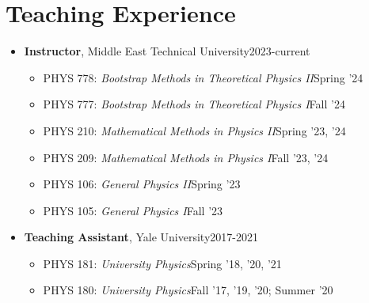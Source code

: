 \documentclass[a4paper,11pt]{article}
\begin{document}
 \section{\textcolor{burntorange}{Teaching Experience}}
\begin{itemize}[noitemsep,nolistsep] 
	\item[] \textbf{Instructor}, Middle East Technical University\hfill 2023-current
\vspace*{-.3em}
\begin{itemize}
	\item[] PHYS 778: \emph{Bootstrap Methods in Theoretical Physics II}\hfill Spring '24\hspace*{2.2em}\vspace*{-.3em}
	\item[] PHYS 777: \emph{Bootstrap Methods in Theoretical Physics I}\hfill Fall '24\hspace*{2.2em}\vspace*{-.3em}
	\item[] PHYS 210: \emph{Mathematical Methods in Physics II}\hfill Spring '23, '24\hspace*{2.2em}\vspace*{-.3em}
	\item[] PHYS 209: \emph{Mathematical Methods in Physics I}\hfill Fall '23, '24\hspace*{2.2em}\vspace*{-.3em}
	\item[] PHYS 106: \emph{General Physics II}\hfill Spring '23\hspace*{2.2em}\vspace*{-.3em}
	\item[] PHYS 105: \emph{General Physics I}\hfill Fall '23\hspace*{2.2em}\vspace*{-.3em}
\end{itemize} 
	\item[] \textbf{Teaching Assistant}, Yale University\hfill 2017-2021
	\vspace*{-.3em}
	\begin{itemize}
		\item[] PHYS 181: \emph{University Physics}\hfill Spring '18, '20, '21\hspace*{2.2em}\vspace*{-.3em}
		\item[] PHYS 180: \emph{University Physics}\hfill Fall '17, '19, '20; Summer '20\hspace*{2.2em}\vspace*{-.3em}

\end{itemize}
\end{itemize}
\end{document}
